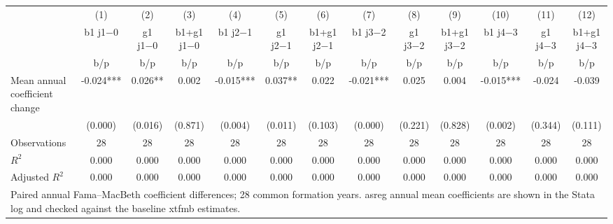 {
\def\sym#1{\ifmmode^{#1}\else\(^{#1}\)\fi}
\begin{tabular}{l*{12}{c}}
\hline\hline
                    &\multicolumn{1}{c}{(1)}&\multicolumn{1}{c}{(2)}&\multicolumn{1}{c}{(3)}&\multicolumn{1}{c}{(4)}&\multicolumn{1}{c}{(5)}&\multicolumn{1}{c}{(6)}&\multicolumn{1}{c}{(7)}&\multicolumn{1}{c}{(8)}&\multicolumn{1}{c}{(9)}&\multicolumn{1}{c}{(10)}&\multicolumn{1}{c}{(11)}&\multicolumn{1}{c}{(12)}\\
                    &\multicolumn{1}{c}{b1 j1−0}&\multicolumn{1}{c}{g1 j1−0}&\multicolumn{1}{c}{b1+g1 j1−0}&\multicolumn{1}{c}{b1 j2−1}&\multicolumn{1}{c}{g1 j2−1}&\multicolumn{1}{c}{b1+g1 j2−1}&\multicolumn{1}{c}{b1 j3−2}&\multicolumn{1}{c}{g1 j3−2}&\multicolumn{1}{c}{b1+g1 j3−2}&\multicolumn{1}{c}{b1 j4−3}&\multicolumn{1}{c}{g1 j4−3}&\multicolumn{1}{c}{b1+g1 j4−3}\\
                    &         b/p   &         b/p   &         b/p   &         b/p   &         b/p   &         b/p   &         b/p   &         b/p   &         b/p   &         b/p   &         b/p   &         b/p   \\
\hline
Mean annual coefficient change&      -0.024***&       0.026** &       0.002   &      -0.015***&       0.037** &       0.022   &      -0.021***&       0.025   &       0.004   &      -0.015***&      -0.024   &      -0.039   \\
                    &     (0.000)   &     (0.016)   &     (0.871)   &     (0.004)   &     (0.011)   &     (0.103)   &     (0.000)   &     (0.221)   &     (0.828)   &     (0.002)   &     (0.344)   &     (0.111)   \\
\hline
Observations        &          28   &          28   &          28   &          28   &          28   &          28   &          28   &          28   &          28   &          28   &          28   &          28   \\
\(R^{2}\)           &       0.000   &       0.000   &       0.000   &       0.000   &       0.000   &       0.000   &       0.000   &       0.000   &       0.000   &       0.000   &       0.000   &       0.000   \\
Adjusted \(R^{2}\)  &       0.000   &       0.000   &       0.000   &       0.000   &       0.000   &       0.000   &       0.000   &       0.000   &       0.000   &       0.000   &       0.000   &       0.000   \\
\hline\hline
\multicolumn{13}{l}{\footnotesize Paired annual Fama–MacBeth coefficient differences; 28 common formation years. asreg annual mean coefficients are shown in the Stata log and checked against the baseline xtfmb estimates.}\\
\end{tabular}
}

